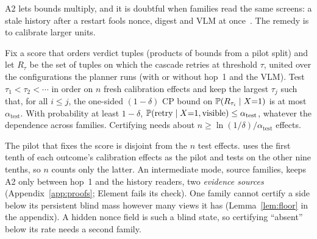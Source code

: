 A2 lets bounds multiply, and it is doubtful when families read the same screens: a stale history after a restart fools nonce, digest and VLM at
once~\cite{zheng2026vpcontrol}. The remedy is to calibrate larger units.

\begin{proposition}
\label{prop:joint}
Fix a score that orders verdict tuples (products of bounds from a pilot split) and let $R_\tau$ be the set of tuples on which the cascade retries at threshold $\tau$, united
over the configurations the planner runs (with or without hop~1 and the VLM). Test $\tau_1<\tau_2<\cdots$ in order on $n$ fresh calibration effects and keep the largest
$\tau_j$ such that, for all $i\le j$, the one-sided $(1-\delta)$ CP bound on $\mathbb{P}(R_{\tau_i}\mid X{=}1)$ is at most $\alpha_{\mathrm{test}}$. With probability at least $1-\delta$,
$\mathbb{P}(\text{retry}\mid X{=}1,\text{visible})\le\alpha_{\mathrm{test}}$, whatever the dependence across families. Certifying needs about $n\ge\ln(1/\delta)/\alpha_{\mathrm{test}}$ effects.
\end{proposition}
The pilot that fixes the score is disjoint from the $n$ test effects. \sys uses the first tenth of each outcome's calibration effects as the pilot and tests on the other nine tenths,
so $n$ counts only the latter. An intermediate mode, source families, keeps A2 only between hop~1 and the history readers, two \emph{evidence sources} (Appendix~\ref{app:proofs}; Element fails
its check). One family cannot certify a side below its persistent blind mass however many views it has (Lemma~\ref{lem:floor} in the appendix).
A hidden nonce field is such a blind state, so certifying ``absent'' below its rate needs a second family.


